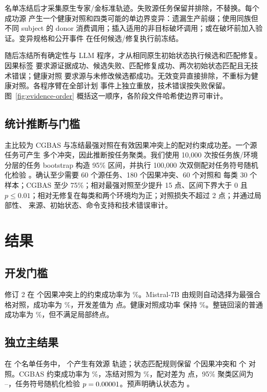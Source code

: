 \documentclass[10pt]{article}
\begin{document}
名单冻结后才采集原生专家/金标准轨迹。失败源任务保留并排除，不替换。每个成功源
产生一个健康对照和四类可能的单边界变异：遗漏生产前缀；使用同族但不同 subject 的
donor 消费调用；插入适用的非目标破坏调用；或在破坏前加入验证。变异规格和公开事件
在任何候选/修复执行前冻结。

随后冻结所有确定性与 LLM 程序，才从相同原生初始状态执行候选和匹配修复。因果标签
要求源证据成功、候选失败、匹配修复成功、两次初始状态匹配且无技术错误；健康对照
要求源与未修改候选都成功。无效变异直接排除，不重标为健康对照。各程序臂在全部计划
事件上独立重放，技术错误按失败保留。
图~\ref{fig:evidence-order} 概括这一顺序，各阶段文件哈希使边界可审计。

\subsection{统计推断与门槛}
主比较为 CGBAS 与冻结最强对照在有效因果冲突上的配对约束成功差。一个源任务可产生
多个冲突，因此推断按任务聚类。我们使用 10,000 次按任务族/环境分层的任务 bootstrap
构造 95\% 区间，并执行 100,000 次双侧配对任务符号随机化检验
\citep{efron1994bootstrap}。确认至少需要 60 个源任务、180 个因果冲突、60 个对照和
每类 30 个样本；CGBAS 至少 75\%；相对最强对照至少提升 15 点、区间下界大于 0 且
$p\leq0.01$；相对无修复在每类和两个环境均为正；对照损失不超过 2 点；并通过局部性、
来源、初始状态、命令支持和技术错误审计。

\section{结果}

\subsection{开发门槛}


修订 2 在 \DevelopmentCausalCount{} 个因果冲突上的约束成功率为
\DevelopmentMethodRate\%。Mistral-7B 由规则自动选择为最强合格对照，成功率为
\DevelopmentComparatorRate\%，开发差值为 \DevelopmentGain{} 点。健康对照成功率
保持 \DevelopmentControlRate\%。整链回滚的普通成功率为
\DevelopmentRollbackRate\%，但不满足局部终点。

\subsection{独立主结果}


在 \ConfirmationRosterCount{} 个名单任务中，\SuccessfulSourceCount{} 个产生有效源
轨迹；状态匹配规则保留 \ValidCausalCount{} 个因果冲突和 \ValidControlCount{} 个
对照。CGBAS 约束成功率为 \PrimaryMethodRate\%，冻结对照为
\PrimaryComparatorRate\%，配对差为 \PrimaryGain{} 点，95\% 聚类区间为
\PrimaryCILow--\PrimaryCIHigh，任务符号随机化检验 $p=0.00001$。预声明确认状态为
\ConfirmationStatus{}。
\end{document}
